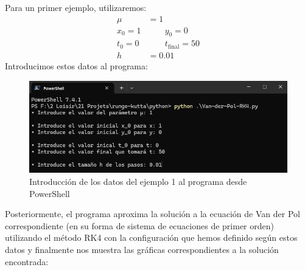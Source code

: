 Para un primer ejemplo, utilizaremos:
\begin{align*}
    \mu &= 1 \\
    x_{0} = 1 &\qquad y_{0} = 0 \\
    t_{0} = 0 &\qquad t_{\text{final}} = 50 \\
    h &= 0.01
\end{align*}
Introducimos estos datos al programa:
\begin{figure}[H]
	\centering
	\includegraphics[scale=0.65]{../auxiliary/assets/ejemplo1-datos.png}
	\caption{Introducción de los datos del ejemplo 1 al programa desde PowerShell}
\end{figure}
Posteriormente, el programa aproxima la solución a la ecuación de Van der Pol correspondiente (en su forma de sistema de ecuaciones de primer orden) utilizando el método RK4 con la configuración que hemos definido según estos datos y finalmente nos muestra las gráficas correspondientes a la solución encontrada:
